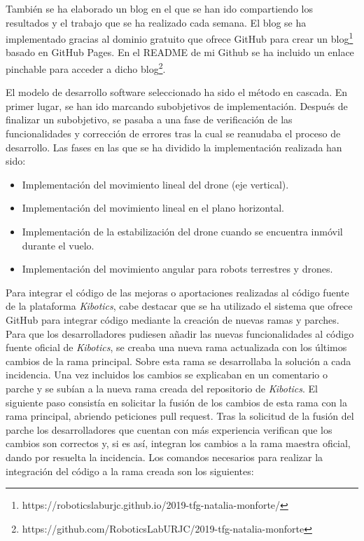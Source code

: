 También se ha elaborado un blog en el que se han ido compartiendo los resultados y el trabajo que se ha realizado cada semana. El blog se ha implementado gracias al dominio gratuito que ofrece GitHub para crear un blog\footnote{https://roboticslaburjc.github.io/2019-tfg-natalia-monforte/} basado en GitHub Pages. En el README de mi Github se ha incluido un enlace pinchable para acceder a dicho blog\footnote{https://github.com/RoboticsLabURJC/2019-tfg-natalia-monforte}. \newline

El modelo de desarrollo software seleccionado ha sido el método en cascada. En primer lugar, se han ido marcando subobjetivos de implementación. Después de finalizar un subobjetivo, se pasaba a una fase de verificación de las funcionalidades y corrección de errores tras la cual se reanudaba el proceso de desarrollo. Las fases en las que se ha dividido la implementación realizada han sido: 

\begin{itemize}
    \item Implementación del movimiento lineal del drone (eje vertical).
    \item Implementación del movimiento lineal en el plano horizontal.
    \item Implementación de la estabilización del drone cuando se encuentra inmóvil durante el vuelo.
    \item Implementación del movimiento angular para robots terrestres y drones.
\end{itemize}

Para integrar el código de las mejoras o aportaciones realizadas al código fuente de la plataforma \textit{Kibotics}, cabe destacar que se ha utilizado el sistema que ofrece GitHub para integrar código mediante la creación de nuevas ramas y parches. Para que los desarrolladores pudiesen añadir las nuevas funcionalidades al código fuente oficial de \textit{Kibotics}, se creaba una nueva rama actualizada con los últimos cambios de la rama
principal. Sobre esta rama se desarrollaba la solución a cada incidencia. Una vez incluidos los cambios se explicaban en un comentario o parche y se subían a la nueva rama creada del repositorio de \textit{Kibotics}. El siguiente paso consistía en solicitar la fusión de los cambios de esta rama con
la rama principal, abriendo peticiones pull request. Tras la solicitud de la fusión del parche los desarrolladores que cuentan con más experiencia verifican que los cambios son correctos y, si es así, integran los cambios a la rama maestra oficial, dando por resuelta la incidencia. Los comandos necesarios para realizar la integración del código a la rama creada son los siguientes: 

